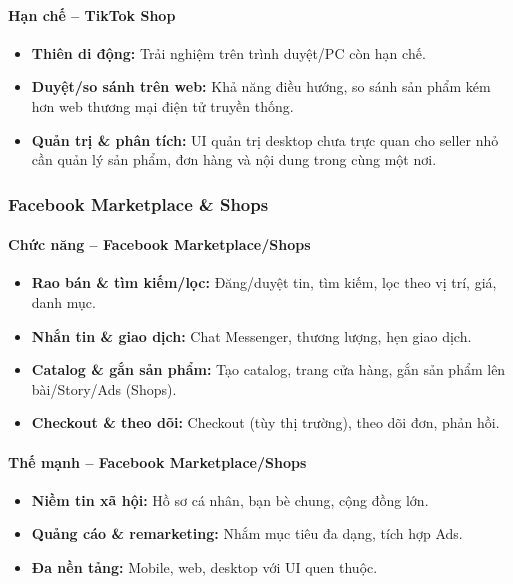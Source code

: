 \paragraph{Hạn chế – TikTok Shop}
\begin{itemize}
    \item \textbf{Thiên di động:} Trải nghiệm trên trình duyệt/PC còn hạn chế.
    \item \textbf{Duyệt/so sánh trên web:} Khả năng điều hướng, so sánh sản phẩm kém hơn web thương mại điện tử truyền thống.
    \item \textbf{Quản trị \& phân tích:} UI quản trị desktop chưa trực quan cho seller nhỏ cần quản lý sản phẩm, đơn hàng và nội dung trong cùng một nơi.
\end{itemize}

\subsubsection{Facebook Marketplace \& Shops}
\paragraph{Chức năng – Facebook Marketplace/Shops}
\begin{itemize}
    \item \textbf{Rao bán \& tìm kiếm/lọc:} Đăng/duyệt tin, tìm kiếm, lọc theo vị trí, giá, danh mục.
    \item \textbf{Nhắn tin \& giao dịch:} Chat Messenger, thương lượng, hẹn giao dịch.
    \item \textbf{Catalog \& gắn sản phẩm:} Tạo catalog, trang cửa hàng, gắn sản phẩm lên bài/Story/Ads (Shops).
    \item \textbf{Checkout \& theo dõi:} Checkout (tùy thị trường), theo dõi đơn, phản hồi.
\end{itemize}

\paragraph{Thế mạnh – Facebook Marketplace/Shops}
\begin{itemize}
    \item \textbf{Niềm tin xã hội:} Hồ sơ cá nhân, bạn bè chung, cộng đồng lớn.
    \item \textbf{Quảng cáo \& remarketing:} Nhắm mục tiêu đa dạng, tích hợp Ads.
    \item \textbf{Đa nền tảng:} Mobile, web, desktop với UI quen thuộc.
\end{itemize}

